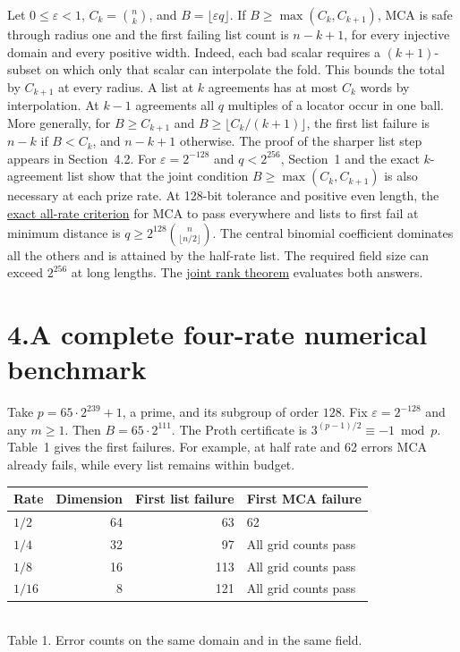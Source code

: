 \documentclass[11pt,letterpaper]{article}
\newcommand{\head}[1]{\vspace{.2em}{\large\bfseries\color{ink}#1}\par}
\begin{document}
\head{Corollary 4.}
Let $0\le\varepsilon<1$, $C_k=\binom nk$, and $B=\lfloor\varepsilon q\rfloor$.
If $B\ge\max(C_k,C_{k+1})$, MCA is safe through radius one and the first failing
list count is $n-k+1$, for every injective domain and every positive width.
Indeed, each bad scalar requires a $(k+1)$-subset on which only that scalar can
interpolate the fold. This bounds the total by $C_{k+1}$ at every radius.
A list at $k$ agreements has at most $C_k$ words by interpolation. At $k-1$ agreements
all $q$ multiples of a locator occur in one ball. More generally, for
$B\ge C_{k+1}$ and $B\ge\lfloor C_k/(k+1)\rfloor$, the first list failure is $n-k$
if $B<C_k$, and $n-k+1$ otherwise. The proof of the sharper list step appears in
Section~4.2. For $\varepsilon=2^{-128}$ and $q<2^{256}$, Section~1 and the exact $k$-agreement list show that the joint condition $B\ge\max(C_k,C_{k+1})$ is also necessary at each prize rate. At 128-bit tolerance and positive even length, the \href{https://github.com/SlopDotCash/proximityprize/blob/041479b5856356a744188bd634d627524c40090f/ArkLib/Research/ProximityGap/JointLargeFieldCriterion.lean}{exact all-rate criterion} for MCA to pass everywhere and lists to first fail at minimum distance is
$q\ge2^{128}\binom{n}{\lfloor n/2\rfloor}$. The central binomial coefficient dominates all the others and is attained by the half-rate list. The required field size can exceed $2^{256}$ at long lengths. The \href{https://github.com/SlopDotCash/proximityprize/blob/d6dc87eefe9bd2a20d9e4f5d207079eaaffdb844/ArkLib/Research/ProximityGap/JointLargeFieldReview.lean}{joint rank theorem} evaluates both answers.

\newpage
\section*{4.\quad A complete four-rate numerical benchmark}
Take $p=65\cdot2^{239}+1$, a prime, and its subgroup of order $128$. Fix $\varepsilon=2^{-128}$ and any $m\ge1$. Then $B=65\cdot2^{111}$. The Proth certificate is $3^{(p-1)/2}\equiv-1\bmod p$. Table~1 gives the first failures. For example, at half rate and 62 errors MCA already fails, while every list remains within budget.
\begin{center}
\begin{tabular}{@{}lrrl@{}}\toprule
Rate & Dimension & First list failure & First MCA failure\\\midrule
$1/2$ &64&63&62\\
$1/4$ &32&97&All grid counts pass\\
$1/8$ &16&113&All grid counts pass\\
$1/16$ &8&121&All grid counts pass\\\bottomrule
\end{tabular}\\[4pt]
{\small Table 1. Error counts on the same domain and in the same field.}
\end{center}
\end{document}
